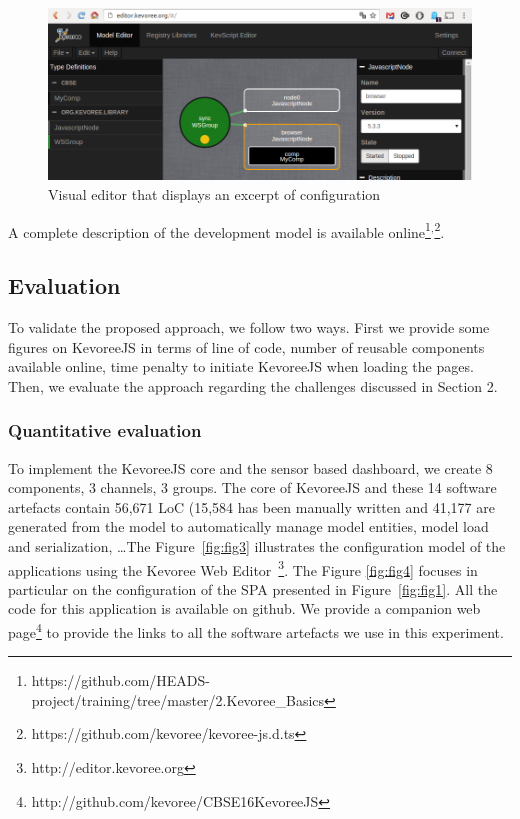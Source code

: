 \begin{figure}[h]
	\centering
	\includegraphics[width=1.\columnwidth]{figures/fig6}
	\caption{Visual editor that displays an excerpt of configuration}
	\label{fig:fig6}
\end{figure}


 A complete description of the development model is available online\footnote{https://github.com/HEADS-project/training/tree/master/2.Kevoree\_Basics}$^{,}$\footnote{https://github.com/kevoree/kevoree-js.d.ts}.

\subsection{Evaluation}
To validate the proposed approach, we follow two ways. First we provide some figures on KevoreeJS in terms of line of code, number of reusable components available online, time penalty to initiate KevoreeJS when loading the pages. Then, we evaluate the approach regarding the challenges discussed in Section 2.

\subsubsection{Quantitative evaluation}
To implement the KevoreeJS core and the sensor based dashboard, we create 8 components, 3 channels, 3 groups. The core of KevoreeJS and these 14 software artefacts contain 56,671 LoC (15,584 has been manually written and 41,177 are generated from the model to automatically manage model entities, model load and serialization, \dots The Figure~\ref{fig:fig3}  illustrates the configuration model of the applications using the Kevoree Web Editor~\footnote{http://editor.kevoree.org}. The Figure \ref{fig:fig4} focuses in particular on the configuration of the SPA presented in Figure~\ref{fig:fig1}. All the code for this application is available on github. We provide a companion web page\footnote{http://github.com/kevoree/CBSE16KevoreeJS} to provide the links to all the software artefacts we use in this experiment.


